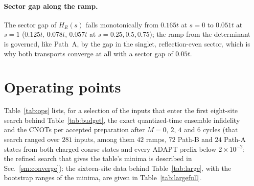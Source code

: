 \documentclass[a4paper,11pt,noarxiv]{quantumarticle}
\begin{document}
\paragraph{Sector gap along the ramp.}
The sector gap of $H_R(s)$ falls monotonically from $0.165t$ at $s=0$ to
$0.051t$ at $s=1$ ($0.125t$, $0.078t$, $0.057t$ at $s=0.25,0.5,0.75$); the
ramp from the determinant is governed, like Path~A, by the gap in the
singlet, reflection-even sector, which is why both transports converge at
all with a sector gap of $0.05t$.

\section{Operating points}
\label{sm:ops}
Table~\ref{tab:ops} lists, for a selection of the inputs that enter the
first eight-site search behind Table~\ref{tab:budget}, the exact
quantized-time ensemble infidelity and the CNOTs per accepted preparation
after $M=0$, $2$, $4$ and $6$ cycles (that search ranged over $281$ inputs,
among them $42$ ramps, $72$ Path-B and $24$ Path-A states from both charged
coarse states and every ADAPT prefix below $2\times10^{-2}$; the refined
search that gives the table's minima is described in
Sec.~\ref{sm:converge}); the
sixteen-site data behind Table~\ref{tab:large}, with the bootstrap ranges
of the minima, are given in Table~\ref{tab:largefull}.
\end{document}
